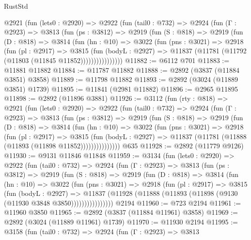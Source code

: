 \begin{lexlean}{RustStd}
\begin{coremodule}
      @2921
        (fun (lets0 : @2920) =>
        @2922
          (fun (tail0 : @732) =>
          @2924
            (fun (Γ : @2923) =>
            @3813
              (fun (ps : @3812) =>
              @2919
                (fun (S : @818) =>
                @2919
                  (fun (D : @818) =>
                  @3814
                    (fun (hn : @10) =>
                    @3022
                      (fun (pns : @3021) =>
                      @2918
                        (fun (pl : @2917) =>
                        @3815
                          (fun (bodyL : @2927) =>
                          @11837 (@11781 (@11792 (@11803 (@11845 @11852))))))))))))))))
@11882 := @6112 @701
@11883 := @11881 @11882
@11884 := @11787 @11882
@11888 := @2892 (@3837 (@11884 @3851) @3858)
@11889 := @11798 @11882
@11893 := @2892 (@3024 (@11889 @3851) @1739)
@11895 := @11841 (@2981 @11882)
@11896 := @2965 @11895
@11898 := @2892 (@11896 @3881)
@11926 := @3112
    (fun (rty : @818) =>
    @2921
      (fun (lets0 : @2920) =>
      @2922
        (fun (tail0 : @732) =>
        @2924
          (fun (Γ : @2923) =>
          @3813
            (fun (ps : @3812) =>
            @2919
              (fun (S : @818) =>
              @2919
                (fun (D : @818) =>
                @3814
                  (fun (hn : @10) =>
                  @3022
                    (fun (pns : @3021) =>
                    @2918
                      (fun (pl : @2917) =>
                      @3815
                        (fun (bodyL : @2927) =>
                        @11837 (@11781 (@11888 (@11893 (@11898 @11852)))))))))))))))
    @635
@11928 := @2892 (@11779 @9126)
@11930 := @9131 @11846 @11848
@11959 := @3134
    (fun (lets0 : @2920) =>
    @2922
      (fun (tail0 : @732) =>
      @2924
        (fun (Γ : @2923) =>
        @3813
          (fun (ps : @3812) =>
          @2919
            (fun (S : @818) =>
            @2919
              (fun (D : @818) =>
              @3814
                (fun (hn : @10) =>
                @3022
                  (fun (pns : @3021) =>
                  @2918
                    (fun (pl : @2917) =>
                    @3815
                      (fun (bodyL : @2927) =>
                      @11837
                        (@11928 (@11888 (@11893 (@11898 (@9130 (@11930 @3848 @3850))))))))))))))))
    @2194
@11960 := @723 @2194
@11961 := @11960 @3850
@11965 := @2892 (@3837 (@11884 @11961) @3858)
@11969 := @2892 (@3024 (@11889 @11961) @1739)
@11970 := @11930 @2194
@11995 := @3158
    (fun (tail0 : @732) =>
    @2924
      (fun (Γ : @2923) =>
      @3813

\end{coremodule}
\end{lexlean}
